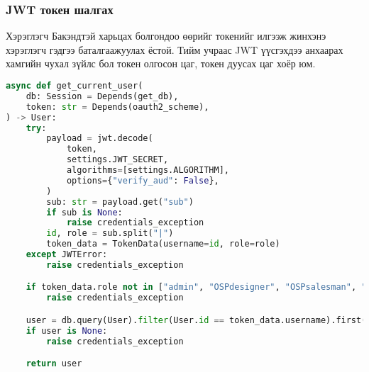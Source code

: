 \subsubsection{JWT токен шалгах}
Хэрэглэгч Бакэндтэй харьцах болгондоо өөрийг токенийг илгээж жинхэнэ хэрэглэгч гэдгээ баталгаажуулах ёстой. Тийм учраас JWT үүсгэхдээ анхаарах хамгийн чухал зүйлс бол токен олгосон цаг, токен дуусах цаг хоёр юм.
\begin{lstlisting}[language=Python,caption={JWT тайлж баталгаажуулах код},frame=single]
	async def get_current_user(
    db: Session = Depends(get_db),
    token: str = Depends(oauth2_scheme),
) -> User:
    try:
        payload = jwt.decode(
            token,
            settings.JWT_SECRET,
            algorithms=[settings.ALGORITHM],
            options={"verify_aud": False},
        )
        sub: str = payload.get("sub")
        if sub is None:
            raise credentials_exception
        id, role = sub.split("|")
        token_data = TokenData(username=id, role=role)
    except JWTError:
        raise credentials_exception

    if token_data.role not in ["admin", "OSPdesigner", "OSPsalesman", "client"]:
        raise credentials_exception

    user = db.query(User).filter(User.id == token_data.username).first()
    if user is None:
        raise credentials_exception

    return user

\end{lstlisting}